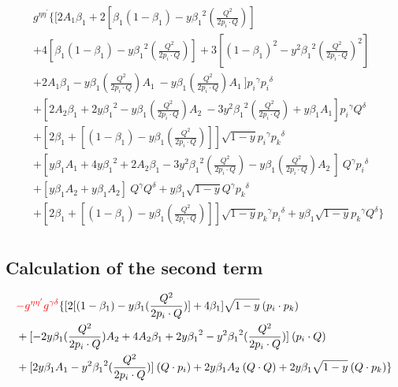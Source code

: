 \begin{equation}
\begin{split} 
& g^{{{\eta}}{{\eta}^{\prime}}}\lbrace [2 A_1\beta_1+2 [\beta_1(1-\beta_1)-y {\beta_1}^2 (\frac{Q^2}{2p_i \cdot Q})]\\
&+4 [\beta_1(1-\beta_1)-y {\beta_1}^2 (\frac{Q^2}{2p_i \cdot Q})]+3 [(1-\beta_1)^2-y^2 {\beta_1}^2 (\frac{Q^2}{2p_i \cdot Q})^2]\\
&+2 A_1\beta_1 -y {\beta_1} (\frac{Q^2}{2p_i \cdot Q}) A_1\:-y {\beta_1} (\frac{Q^2}{2p_i \cdot Q}) A_1 \:] {p_i}^{{\gamma}}{{p_i}^{{\delta}}}\\
&+[2A_2\beta_1+2y {\beta_1}^2 -y {\beta_1} (\frac{Q^2}{2p_i \cdot Q}) A_2\: -3y^2 {\beta_1}^2 (\frac{Q^2}{2p_i \cdot Q})+y {\beta_1} A_1] {p_i}^{{\gamma}}{{Q}^{{\delta}}}\\
&+[2\beta_1+[(1-\beta_1)-y\beta_1 (\frac{Q^2}{2p_i \cdot Q})] ] \sqrt{1-y}{p_i}^{{\gamma}}{{p_k}^{{\delta}}} \\
&+[y {\beta_1} A_1+4y {\beta_1}^2 +2A_2\beta_1 -3y^2 {\beta_1}^2 (\frac{Q^2}{2p_i \cdot Q})-y {\beta_1} (\frac{Q^2}{2p_i \cdot Q}) A_2\: ] \:{Q}^{{\gamma}}{p_i}^{{\delta}}\\
&+[y {\beta_1} A_2+y {\beta_1} A_2] \:{Q}^{{\gamma}}{Q}^{{\delta}}+y {\beta_1}\sqrt{1-y}{Q}^{{\gamma}}{{p_k}^{{\delta}}} \\
&+[2\beta_1 + [(1-\beta_1)-y\beta_1 (\frac{Q^2}{2p_i \cdot Q})] ]\sqrt{1-y}{p_k}^{{\gamma}}{{p_i}^{{\delta}}}+y {\beta_1}\sqrt{1-y}{p_k}^{{\gamma}}{{Q}^{{\delta}}}\rbrace\\
\end{split}
\end{equation}

\subsection*{Calculation of the second term}

\begin{equation}
\begin{split}
&{\color[RGB]{255,0,0} -g^{{{\eta}}{{\eta}^{\prime}}}g^{{{\gamma}}{{\delta}}}}\lbrace [2[(1-\beta_1)-y\beta_1 (\frac{Q^2}{2p_i \cdot Q})]+4\beta_1] \sqrt{1-y}\:({p_i}\cdot{p_k})\\
&+[-2y {\beta_1} (\frac{Q^2}{2p_i \cdot Q}) A_2+4A_2\beta_1 +2y {\beta_1}^2 -y^2 {\beta_1}^2 (\frac{Q^2}{2p_i \cdot Q})]\: ({p_i}\cdot{Q})\\
&+[2y {\beta_1} A_1-y^2 {\beta_1}^2 (\frac{Q^2}{2p_i \cdot Q})] \:({Q}\cdot{p_i})+2y {\beta_1} A_2 \:({Q}\cdot{Q})+2y {\beta_1}\sqrt{1-y}\:({Q}\cdot{p_k})\rbrace
\end{split}
\end{equation}


